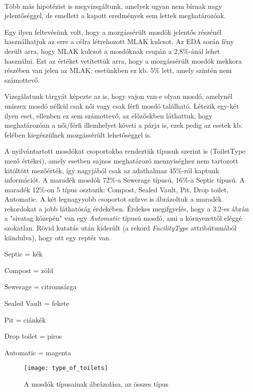 	\paragraph{}
	Több más hipotézist is megvizsgáltunk, amelyek ugyan nem bírnak nagy jelentőséggel, de emellett a kapott eredmények sem lettek meghatározóak.\par
	Egy ilyen feltevésünk volt, hogy a mozgássérült mosdók jelentős részénél használhatjuk az erre a célra létrehozott MLAK kulcsot. Az EDA során fény derült arra, hogy MLAK kulcsot a mosdóknak csupán a 2,8\%-ánál lehet használni. Ezt az értéket vetítettük arra, hogy a mozgássérült mosdók mekkora részében van jelen az MLAK: esetünkben ez kb. 5\% lett, amely szintén nem számottevő.\par
	Vizsgálatunk tárgyát képezte az is, hogy vajon van-e olyan mosdó, amelynél uniszex mosdó nélkül csak női vagy csak férfi mosdó található. Létezik egy-két ilyen eset, ellenben ez sem számottevő, az előzőekben láthattuk, hogy meghatározóan a női/férfi illemhelyet követi a párja is, ezek pedig az esetek kb. felében kiegészülnek mozgássérült lehetőséggel is.\par
	A nyilvántartott mosdókat csoportokba rendeztük típusuk szerint is (ToiletType mező értékei), amely esetben sajnos meghatározó mennyiséghez nem tartozott kitöltött mezőérték, így nagyjából csak az adathalmaz 45\%-ról kaptunk információt. A maradék mosdók 72\%-a Sewerage típusú, 16\%-a Septic típusú. A maradék 12\%-on 5 típus osztozik: Compost, Sealed Vault, Pit, Drop toilet, Automatic. A két legnagyyobb csoportot  szűrve is ábrázoltuk a maradék rekordokat a jobb láthatóság érdekében. Érdekes megifgyelés, hogy a 3.2-es ábrán a "sivatag közepén" van egy \textit{Automatic} típusú mosdó, ami a környezettől eléggé szokatlan. Rövid kutatás után kiderült (a rekord \textit{FacilityType} attribútumából kiindulva), hogy ott egy reptér van.
	\begin{compactlist}
		\item Septic = kék
		\item Compost = zöld
		\item Sewerage = citromsárga
		\item Sealed Vault = fekete
		\item Pit = ciánkék
		\item Drop toilet = piros
		\item Automatic = magenta
	\end{compactlist}\par
	\begin{figure}[!ht]
		\centering	
			\texttt{[image: type\_of\_toilets]}
			\caption{A mosdók típusainak ábrázolása, az összes típus}
	\end{figure}
